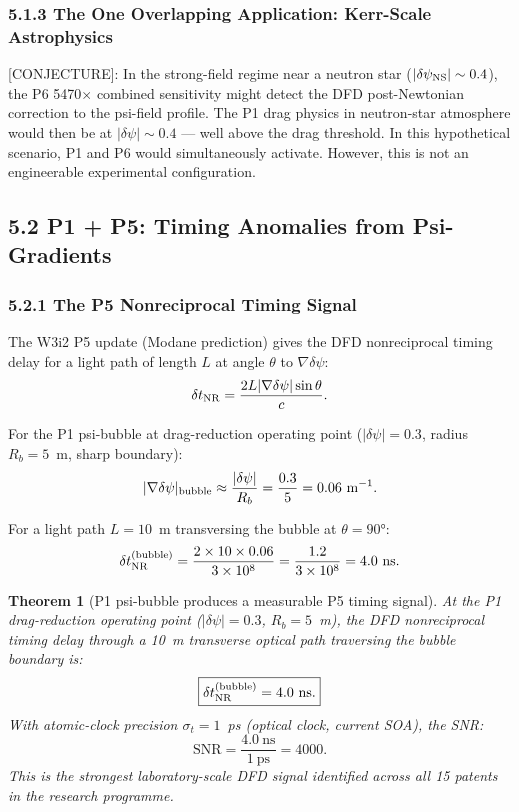 \documentclass[11pt,twocolumn]{article}
\newcommand{\dpsi}{\delta\psi}
\newcommand{\SNR}{\mathrm{SNR}}
\newtheorem{theorem}{Theorem}
\begin{document}
\subsubsection*{5.1.3 The One Overlapping Application: Kerr-Scale
Astrophysics}

\textcolor{conjecturecolor}{[CONJECTURE]: In the strong-field regime near
a neutron star ($|\dpsi_{\rm NS}| \sim 0.4$), the P6 5470$\times$ combined
sensitivity might detect the DFD post-Newtonian correction to the psi-field
profile. The P1 drag physics in neutron-star atmosphere would then be at
$|\dpsi| \sim 0.4$ --- well above the drag threshold. In this hypothetical
scenario, P1 and P6 would simultaneously activate. However, this is not an
engineerable experimental configuration.}

\subsection*{5.2 P1 + P5: Timing Anomalies from Psi-Gradients}

\subsubsection*{5.2.1 The P5 Nonreciprocal Timing Signal}

The W3i2 P5 update (Modane prediction) gives the DFD nonreciprocal
timing delay for a light path of length $L$ at angle $\theta$ to
$\nabla\dpsi$:
\begin{equation}
\delta t_{\rm NR} = \frac{2L|\nabla\dpsi|\sin\theta}{c}.
\label{eq:P5_NR}
\end{equation}

For the P1 psi-bubble at drag-reduction operating point ($|\dpsi| = 0.3$,
radius $R_b = 5$~m, sharp boundary):
\begin{equation}
|\nabla\dpsi|_{\rm bubble} \approx \frac{|\dpsi|}{R_b} = \frac{0.3}{5} = 0.06~\text{m}^{-1}.
\label{eq:bubble_gradient}
\end{equation}

For a light path $L = 10$~m transversing the bubble at $\theta = 90°$:
\begin{equation}
\delta t_{\rm NR}^{(\rm bubble)} = \frac{2\times10\times0.06}{3\times10^8}
= \frac{1.2}{3\times10^8}
= 4.0~\text{ns}.
\label{eq:bubble_NR}
\end{equation}

\begin{theorem}[P1 psi-bubble produces a measurable P5 timing signal]
\label{thm:P1P5}
At the P1 drag-reduction operating point ($|\dpsi| = 0.3$, $R_b = 5$~m),
the DFD nonreciprocal timing delay through a 10~m transverse optical path
traversing the bubble boundary is:
\begin{equation}
\boxed{
\delta t_{\rm NR}^{(\rm bubble)} = 4.0~\text{ns}.
}
\end{equation}
With atomic-clock precision $\sigma_t = 1$~ps (optical clock, current SOA),
the SNR:
\begin{equation}
\SNR = \frac{4.0~\text{ns}}{1~\text{ps}} = 4000.
\end{equation}
This is the strongest laboratory-scale DFD signal identified across all
15 patents in the research programme.
\end{theorem}
\end{document}
